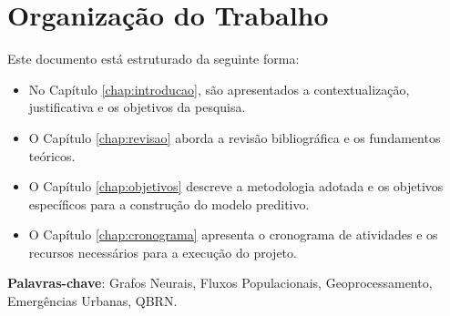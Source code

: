 \section{Organização do Trabalho}
Este documento está estruturado da seguinte forma:
\begin{itemize}[noitemsep]
    \item No Capítulo \ref{chap:introducao}, são apresentados a contextualização, justificativa e os objetivos da pesquisa.
    \item O Capítulo \ref{chap:revisao} aborda a revisão bibliográfica e os fundamentos teóricos.
    \item O Capítulo \ref{chap:objetivos} descreve a metodologia adotada e os objetivos específicos para a construção do modelo preditivo.
    \item O Capítulo \ref{chap:cronograma} apresenta o cronograma de atividades e os recursos necessários para a execução do projeto.
\end{itemize}

\bigskip

\noindent \textbf{Palavras-chave}: Grafos Neurais, Fluxos Populacionais, Geoprocessamento, Emergências Urbanas, \gls{QBRN}.
